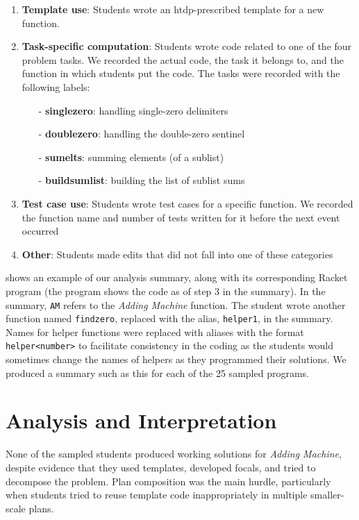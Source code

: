 \documentclass{sig-alternate-05-2015}
\newcommand{\htdp}{{\sc htdp}\xspace}
\def\problemName#1{\emph{#1}\xspace}
\def\Adding{\problemName{Adding Machine}}
\begin{document}
\begin{enumerate}[itemsep=-3pt]
    \item \textbf{Template use}: Students wrote an \htdp-prescribed template for a new function.
    \item \textbf{Task-specific computation}: Students wrote code related to one of the four problem tasks.  We recorded the actual code, the task it belongs to, and the function in which students put the code.  The tasks were recorded with the following labels:
    \begin{itemize}[leftmargin=*,itemsep=-2pt,topsep=0pt]
	\item[-] \textbf{singlezero}: handling single-zero delimiters
        \item[-] \textbf{doublezero}: handling the double-zero sentinel
        \item[-] \textbf{sumelts}: summing elements (of a sublist)
        \item[-] \textbf{buildsumlist}: building the list of sublist sums
	\end{itemize}
    \item \textbf{Test case use}: Students wrote test cases for a specific function.  We recorded the function name and number of tests written for it before the next event occurred
    \item \textbf{Other}: Students made edits that did not fall into one of these categories
\end{enumerate}

 shows an example of our analysis summary, along with its corresponding Racket program (the program shows the code as of step 3 in the summary). In the summary, {\tt AM} refers to the \Adding function. The student wrote another function named {\tt findzero}, replaced with the alias, {\tt helper1}, in the summary. Names for helper functions were replaced with aliases with the format {\tt helper<number>} to facilitate consistency in the coding as the students would sometimes change the names of helpers as they programmed their solutions. We produced a summary such as this for each of the 25 sampled programs.

\section{Analysis and Interpretation}
\label{sec:analysis}

None of the sampled students produced working solutions for \Adding, despite evidence that they used templates, developed focals, and tried to decompose the problem. 
Plan composition was the main hurdle, particularly when students tried to reuse template code inappropriately in multiple smaller-scale plans.
\end{document}
